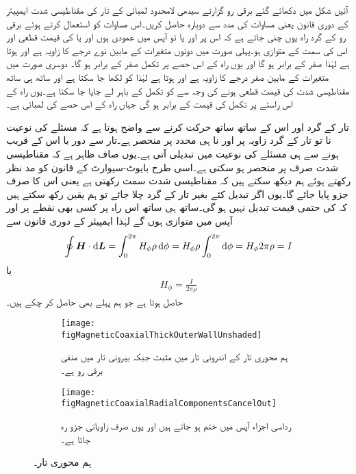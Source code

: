 آئیں شکل  میں دکھائے گئے  برقی رو گزارتے سیدھی لامحدود لمبائی کے تار کی مقناطیسی شدت ایمپیئر کے دوری قانون یعنی مساوات  کی مدد سے دوبارہ حاصل کریں۔اس مساوات کو استعمال کرتے ہوئے  برقی رو کے گرد راہ یوں چنی جاتے ہے کہ اس پر  اور  یا تو آپس میں عمودی ہوں اور یا  کی قیمت قطعی اور اس کی سمت  کے متوازی ہو۔پہلی صورت میں دونوں متغیرات کے مابین نوے درجے کا زاویہ  ہے اور  ہوتا ہے لہٰذا  صفر کے برابر ہو گا اور یوں راہ کے اس حصے پر تکمل صفر کے برابر ہو گا۔ دوسری صورت میں متغیرات کے مابین صفر درجے کا زاویہ ہے اور  ہوتا ہے لہٰذا   کو  لکھا جا سکتا ہے اور ساتھ ہی ساتھ مقناطیسی شدت کی قیمت قطعی ہونے کی وجہ سے  کو تکمل کے باہر لے جایا جا سکتا ہے۔یوں راہ کے اس راستے پر تکمل کی قیمت  کے برابر ہو گی جہاں  راہ کے اس حصے کی لمبائی ہے۔

تار کے گرد اور اس کے ساتھ ساتھ حرکت کرنے سے واضح ہوتا ہے کہ مسئلے کی نوعیت نا تو تار کے گرد زاویہ  پر اور نا ہی محدد  پر منحصر ہے۔تار سے دور یا اس کے قریب ہونے سے ہی مسئلے کی نوعیت میں تبدیلی آتی ہے۔یوں صاف ظاہر ہے کہ مقناطیسی شدت صرف  پر منحصر ہو سکتی ہے۔اسی طرح بایوٹ-سیوارٹ کے قانون کو مد نظر رکھتے ہوئے ہم دیکھ سکتے ہیں کہ مقناطیسی شدت  سمت رکھتی ہے یعنی اس کا صرف  جزو پایا جائے گا۔یوں اگر  تبدیل کئے بغیر تار کے گرد چلا جائے تو ہم یقین رکھ سکتے ہیں کہ  کی حتمی قیمت  تبدیل نہیں ہو گی۔ساتھ ہی ساتھ اس راہ پر کسی بھی نقطے پر   اور  آپس میں متوازی ہوں گے لہٰذا ایمپیئر کے دوری قانون سے
\begin{align*}
\oint \kvec{H} \cdot \dif \kvec{L}=\int_0^{2\pi} H_{\phi} \rho \dif \phi=H_{\phi} \rho \int_0^{2\pi} \dif \phi=H_{\phi} 2\pi \rho=I
\end{align*}
یا
\begin{align*}
H_{\phi}=\frac{I}{2\pi \rho}
\end{align*}
حاصل ہوتا ہے جو ہم پہلے بھی حاصل کر چکے ہیں۔
\begin{figure}
\centering
\begin{subfigure}{0.5\textwidth}
\centering
\texttt{[image: figMagneticCoaxialThickOuterWallUnshaded]}
\caption{ہم محوری تار کے اندرونی تار میں مثبت جبکہ بیرونی تار میں منفی برقی رو ہے۔}
\label{شکل_مقناطیسی_ہم_محوری_تار_مثبت_منفی_رو}
\end{subfigure}%
\begin{subfigure}{0.5\textwidth}
\centering
\texttt{[image: figMagneticCoaxialRadialComponentsCancelOut]}
\caption{رداسی اجزاء آپس میں ختم ہو جاتے ہیں اور یوں صرف زاویاتی جزو رہ جاتا ہے۔}
\label{شکل_مقناطیسی_ہم_محوری_صرف_زاویاتی_جزو}
\end{subfigure}%
\caption{ہم محوری تار۔}
\label{شکل_مقناطیسی_ہم_محوری_تار}
\end{figure}

